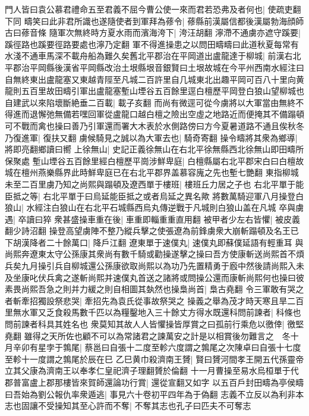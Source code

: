 門人皆曰袁公慕君禮命五至君義不屈今曹公使一來而君若恐弗及者何也|{
	使疏吏翻下同}
疇笑曰此非君所識也遂隨使者到軍拜為蓚令|{
	蓚縣前漢屬信都後漢屬勃海顔師古曰蓚音條}
隨軍次無終時方夏水雨而濱海洿下|{
	洿汪胡翻}
濘滯不通虜亦遮守蹊要|{
	蹊徑路也蹊要徑路要處也濘乃定翻}
軍不得進操患之以問田疇疇曰此道秋夏每常有水淺不通車馬深不載舟船為難久矣舊北平郡治在平岡道出盧龍達于柳城|{
	前漢右北平郡治平岡縣後漢省平岡縣改治土垠縣垠音銀賢曰土垠故城在今平州西南水經注曰自無終東出盧龍塞又東越青陘至凡城二百許里自几城東北出趣平岡可百八十里向黄龍則五百里故田疇引軍出盧龍塞塹山堙谷五百餘里逕白檀歷平岡登白狼山望柳城也}
自建武以來陷壞斷絶垂二百載|{
	載子亥翻}
而尚有微逕可從今虜將以大軍當由無終不得進而退懈弛無備若嘿回軍從盧龍口越白檀之險出空虛之地路近而便掩其不備蹋頓可不戰而禽也操曰善乃引軍還而署大木表於水側路傍曰方今夏暑道路不通且俟秋冬乃復進軍|{
	復扶又翻}
虜候騎見之誠以為大軍去也|{
	騎奇寄翻}
操令疇將其衆為鄉導|{
	將即亮翻鄉讀曰嚮}
上徐無山|{
	史記正義徐無山在右北平徐無縣西北徐無山即田疇所保聚處}
塹山堙谷五百餘里經白檀歷平崗涉鮮卑庭|{
	白檀縣屬右北平郡宋白曰白檀故城在檀州燕樂縣界此時鮮卑庭已在右北平郡界盖慕容廆之先也塹七艷翻}
東指柳城未至二百里虜乃知之尚熙與蹋頓及遼西單于樓班|{
	樓班丘力居之子也}
右北平單于能臣抵之等|{
	右北平單于曰烏延能臣抵之或者烏延之異名歟}
將數萬騎迎軍八月操登白狼山|{
	水經注白狼山在右北平石城縣西烏丸傳逆戰于凡城則白狼山盖在凡城}
卒與虜遇|{
	卒讀曰猝}
衆甚盛操車重在後|{
	車重即輜重重直用翻}
被甲者少左右皆懼|{
	被皮義翻少詩沼翻}
操登高望虜陣不整乃縱兵擊之使張遼為前鋒虜衆大崩斬蹋頓及名王已下胡漢降者二十餘萬口|{
	降戶江翻}
遼東單于速僕丸|{
	速僕丸即蘇僕延語有輕重耳}
與尚熙奔遼東太守公孫康其衆尚有數千騎或勸操遂擊之操曰吾方使康斬送尚熙首不煩兵矣九月操引兵自柳城還公孫康欲取尚熙以為功乃先置精勇于廏中然後請尚熙入未及坐康叱伏兵禽之遂斬尚熙并速僕丸首送之諸將或問操公還而康斬尚熙何也操曰彼素畏尚熙吾急之則并力緩之則自相圖其埶然也操梟尚首|{
	梟古堯翻}
令三軍敢有哭之者斬牽招獨設祭悲哭|{
	牽招先為袁氏從事故祭哭之}
操義之舉為茂才時天寒且旱二百里無水軍又乏食殺馬數千匹以為糧鑿地入三十餘丈方得水既還科問前諫者|{
	科條也問前諫者科具其姓名也}
衆莫知其故人人皆懼操皆厚賞之曰孤前行乘危以徼倖|{
	徼堅堯翻}
雖得之天所佐也顧不可以為常諸君之諫萬安之計是以相賞後勿難言之　冬十月辛卯有星孛于鶉尾|{
	蔡邕曰自張十二度至軫六度謂之鶉尾之次陳卓曰自張十七度至軫十一度謂之鶉尾於辰在巳}
乙巳黄巾殺濟南王贇|{
	賢曰贇河間孝王開五代孫靈帝立其父康為濟南王以奉孝仁皇祀濟子理翻贇於倫翻}
十一月曹操至易水烏桓單于代郡普富盧上郡那樓皆來賀師還論功行賞|{
	還從宣翻又如字}
以五百戶封田疇為亭侯疇曰吾始為劉公報仇率衆遁逃|{
	事見六十卷初平四年為于偽翻}
志義不立反以為利非本志也固讓不受操知其至心許而不奪|{
	不奪其志也孔子曰匹夫不可奪志}
